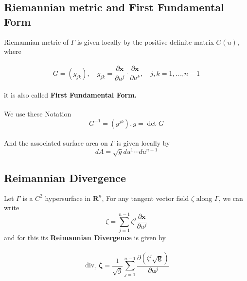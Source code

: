 \documentclass[oneside]{book}
\begin{document}
\subsection{Riemannian metric and First Fundamental Form}
\label{ss:12}
{Riemannian metric} of $\Gamma$ is given
locally by the positive definite matrix $G(u),$ where 
\\\\
  \begin{equation}
  \label{eq17}  
 G=\left(g_{j k}\right), \quad g_{j k}=\frac{\partial \mathbf{x}}{\partial u^{j}} \cdot \frac{\partial \mathbf{x}}{\partial u^{k}}, \quad j, k=1, \ldots, n-1     \end{equation}
\\
it is also called \textbf{First Fundamental Form.} \\\\
   We use these Notation \\
   \[ G^{-1}=\left(g^{j k}\right),   g=\operatorname{det}{G} \] \\
    And the associated surface area on  
   $\Gamma$ is given locally by \\


   \begin{equation}
   \label{eq18}  
    d A=\sqrt{g} d u^{1} \cdots d u^{n-1} 
\end{equation}

   
  







\subsection{Reimannian Divergence}
\label{ss:13}
Let $\Gamma$ is a $C^{2}$ hypersurface in $\mathbf{R}^{n}$,
For any tangent vector field $\zeta$ along $\Gamma$, we can write 
$$
\zeta=\sum_{j=1}^{n-1} \zeta^{j} \frac{\partial \mathbf{x}}{\partial u^{j}}
$$
and for this its \textbf{Reimannian Divergence} is given by \\\\
\begin{equation}
\label{eq19}  
     \operatorname{div}_{\mathrm{r}} \boldsymbol{\zeta}=\frac{1}{\sqrt{g}} \sum_{j=1}^{n-1} \frac{\partial\left(\zeta^{j} \sqrt{\boldsymbol{g}}\right)}{\partial \boldsymbol{u}^{j}}  
\end{equation}
     
    
    
    
\end{document}
